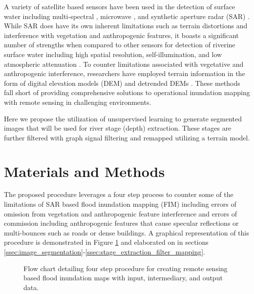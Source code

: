 \documentclass{article}
\begin{document}
A variety of satellite based sensors have been used in the detection of surface water including multi-spectral \cite{nigro2014nasa,sanyal2004application,wang2004using,brakenridge2006modis,jain2005delineation,nghiem2000flood,hussain2011mapping,frazier2000water,dewan2006flood,brivio2002integration}, microwave \cite{de2015global,schumann2015microwave,de2010flood,bindlish2008role,de2009global,kundu2015flood}, and synthetic aperture radar (SAR) \cite{aristizabal2020high,shastry2019using,martinis2010automatic,kudahetty2012flood,schlaffer2015flood,chini2019sentinel,chaabani2018flood,huang2018automated,saatchi2019sar,kasischke2003effects,hess2003dual}.
While SAR does have its own inherent limitations such as terrain distortions and interference with vegetation and anthropogenic features, it boasts a significant number of strengths when compared to other sensors for detection of riverine surface water including high spatial resolution, self-illumination, and low atmospheric attenuation \cite{saatchi2019sar,muckenhuber2016open}.
To counter limitations associated with vegetative and anthropogenic interference, researchers have employed terrain information in the form of digital elevation models (DEM) and detrended DEMs \cite{townsend1998modeling,aristizabal2020high,shastry2019using,saatchi2019sar,twele2016sentinel,huang2017comparison}.
These methods fall short of providing comprehensive solutions to operational inundation mapping with remote sensing in challenging environments.

Here we propose the utilization of unsupervised learning to generate segmented images that will be used for river stage (depth) extraction. 
These stages are further filtered with graph signal filtering and remapped utilizing a terrain model.
%
\section{Materials and Methods}
\label{sec:materials_and_methods}
%
The proposed procedure leverages a four step process to counter some of the limitations of SAR based flood inundation mapping (FIM) including errors of omission from vegetation and anthropogenic feature interference and errors of commission including anthropogenic features that cause specular reflections or multi-bounces such as roads or dense buildings.
A graphical representation of this procedure is demonstrated in Figure \ref{fig:process_flowchart} and elaborated on in sections \ref{ssec:image_segmentation}-\ref{ssec:stage_extraction_filter_mapping}.
%
\begin{figure}[htb]
    \begin{minipage}[b]{1.0\linewidth}
        \centering
        \centerline{}
    \end{minipage}
    \caption{Flow chart detailing four step procedure for creating remote sensing based flood inundation maps with input, intermediary, and output data.}
    \label{fig:process_flowchart}
\end{figure}
%
\end{document}

